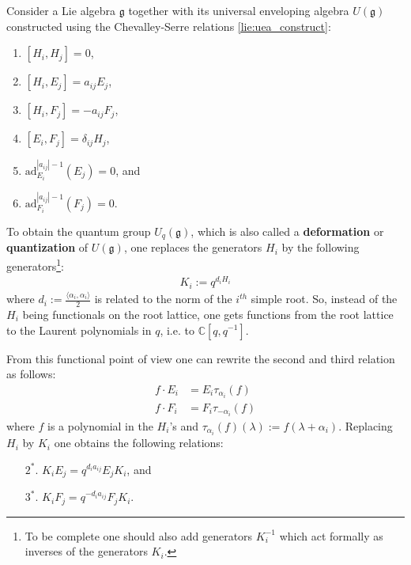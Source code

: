     \begin{construct}
        Consider a Lie algebra $\mathfrak{g}$ together with its universal enveloping algebra $U(\mathfrak{g})$ constructed using the Chevalley-Serre relations \ref{lie:uea_construct}:
        \begin{enumerate}
            \item $[H_i,H_j] = 0$,
            \item $[H_i,E_j] = a_{ij}E_j$,
            \item $[H_i,F_j] = -a_{ij}F_j$,
            \item $[E_i,F_j] = \delta_{ij}H_j$,
            \item $\text{ad}_{E_i}^{|a_{ij}|-1}(E_j) = 0$, and
            \item $\text{ad}_{F_i}^{|a_{ij}|-1}(F_j) = 0$.
        \end{enumerate}
         To obtain the quantum group $U_q(\mathfrak{g})$, which is also called a \textbf{deformation} or \textbf{quantization} of $U(\mathfrak{g})$, one replaces the generators $H_i$ by the following generators\footnote{To be complete one should also add generators $K_i^{-1}$ which act formally as inverses of the generators $K_i$.}:
        \begin{gather}
            K_i := q^{d_iH_i}
        \end{gather}
        where $d_i := \frac{\langle\alpha_i, \alpha_i\rangle}{2}$ is related to the norm of the $i^{th}$ simple root. So, instead of the $H_i$ being functionals on the root lattice, one gets functions from the root lattice to the Laurent polynomials in $q$, i.e. to $\mathbb{C}[q, q^{-1}]$.

        From this functional point of view one can rewrite the second and third relation as follows:
        \begin{align*}
            f\cdot E_i &= E_i\tau_{\alpha_i}(f)\\
            f\cdot F_i &= F_i\tau_{-\alpha_i}(f)
        \end{align*}
        where $f$ is a polynomial in the $H_i$'s and $\tau_{\alpha_i}(f)(\lambda) := f(\lambda+\alpha_i)$. Replacing $H_i$ by $K_i$ one obtains the following relations:
        \begin{enumerate}
            \item[$2^*.$] $K_iE_j = q^{d_ia_{ij}}E_jK_i$, and
            \item[$3^*.$] $K_iF_j = q^{-d_ia_{ij}}F_jK_i$.
        \end{enumerate}


\end{construct}
